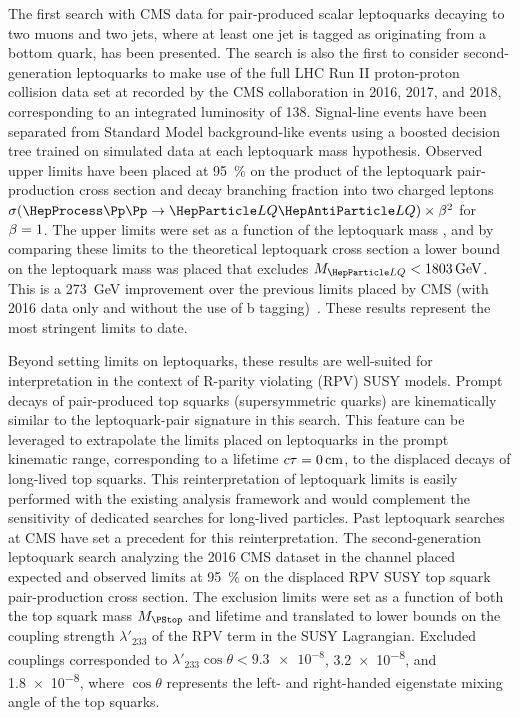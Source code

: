 

The first search with CMS data for pair-produced scalar leptoquarks decaying to two muons and two jets, where at least one jet is tagged as originating from a bottom quark, has been presented. The search is also the first to consider second-generation leptoquarks to make use of the full LHC Run II proton-proton collision data set at  recorded by the CMS collaboration in 2016, 2017, and 2018, corresponding to an integrated luminosity of \SI{138}{\invfb}. Signal-line events have been separated from Standard Model background-like events using a boosted decision tree trained on simulated data at each leptoquark mass hypothesis. Observed upper limits have been placed at \SI{95}{\%} \CL on the product of the leptoquark pair-production cross section and decay branching fraction into two charged leptons \linebreak $\xsec(\ppToLQLQ)\times\bfuu$ for $\beta = 1$. The upper limits were set as a function of the leptoquark mass \MLQ, and by comparing these limits to the theoretical leptoquark cross section  a lower bound on the leptoquark mass was placed that excludes $\MLQ < \SI{1803}{\GeV}$. This is a \SI{273}{\GeV} improvement over the previous limits placed by CMS (with 2016 data only and without the use of b tagging)~\cite{CMSLQ2_2016}. These results represent the most stringent limits to date.

Beyond setting limits on leptoquarks, these results are well-suited for interpretation in the context of R-parity violating (RPV) SUSY models. Prompt decays of pair-produced top squarks \PStop (supersymmetric quarks) are kinematically similar to the leptoquark-pair signature in this search. This feature can be leveraged to extrapolate the limits placed on leptoquarks in the prompt kinematic range, corresponding to a lifetime $\ct = \SI{0}{\cm}$, to the displaced decays of long-lived top squarks. This reinterpretation of leptoquark limits is easily performed with the existing analysis framework and would complement the sensitivity of dedicated searches for long-lived particles. Past leptoquark searches at CMS have set a precedent for this reinterpretation. The second-generation leptoquark search analyzing the 2016 CMS dataset in the \mumujj channel placed expected and observed limits at \SI{95}{\%} \CL on the displaced RPV SUSY top squark pair-production cross section. The exclusion limits were set as a function of both the top squark mass $M_{\PStop}$ and lifetime \ct and translated to lower bounds on the coupling strength $\lambda'_{233}$ of the RPV term in the SUSY Lagrangian. Excluded couplings corresponded to $\lambda'_{233}\cos\theta < \num{9.3e-8}$, \num{3.2e-8}, and 1.\num{8e-8}, where $\cos\theta$ represents the left- and right-handed eigenstate mixing angle of the top squarks.

